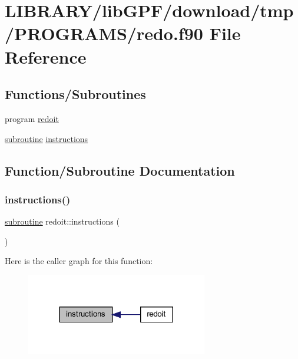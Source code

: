 \hypertarget{redo_8f90}{}\section{L\+I\+B\+R\+A\+R\+Y/lib\+G\+P\+F/download/tmp/\+P\+R\+O\+G\+R\+A\+M\+S/redo.f90 File Reference}
\label{redo_8f90}
\subsection*{Functions/\+Subroutines}
\begin{DoxyCompactItemize}
\item 
program \hyperlink{redo_8f90_a4f300f7db1b9163c705b941bcd47d4f9}{redoit}
\item 
\hyperlink{M__stopwatch_83_8txt_acfbcff50169d691ff02d4a123ed70482}{subroutine} \hyperlink{redo_8f90_af1f8c3c3b3f7a4bca478ea67f2fefc09}{instructions}
\end{DoxyCompactItemize}


\subsection{Function/\+Subroutine Documentation}
\mbox{\label{redo_8f90_af1f8c3c3b3f7a4bca478ea67f2fefc09}} 
\subsubsection{\texorpdfstring{instructions()}{instructions()}}
{\footnotesize\ttfamily \hyperlink{M__stopwatch_83_8txt_acfbcff50169d691ff02d4a123ed70482}{subroutine} redoit\+::instructions (\begin{DoxyParamCaption}{ }\end{DoxyParamCaption})}

Here is the caller graph for this function\+:
\nopagebreak
\begin{figure}[H]
\begin{center}
\leavevmode
\includegraphics[width=224pt]{redo_8f90_af1f8c3c3b3f7a4bca478ea67f2fefc09_icgraph}
\end{center}
\end{figure}
\mbox{\label{redo_8f90_a4f300f7db1b9163c705b941bcd47d4f9}} 
